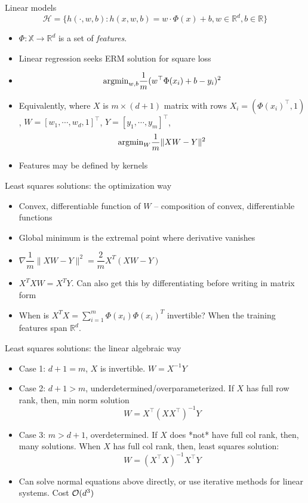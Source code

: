 \documentclass[final]{beamer}
\begin{document}
\begin{frame}{Linear models}
	\begin{equation}
		\mathcal{H} = \{h(\cdot, w, b): h(x, w, b) = w\cdot \Phi(x) + b, w \in \mathbb{R}^d, b \in \mathbb{R} \}
	\end{equation}
\pause
\begin{itemize}
	\item $\Phi: \mathbb{X} \to \mathbb{R}^d$ is a set of \emph{features}.
	\pause
	\item Linear regression seeks ERM solution for square loss
	\pause
	\item $${\rm arg min}_{w, b} \dfrac{1}{m} (w^\top \Phi(x_i) + b - y_i)^2$$
	\pause 
\item Equivalently, where $X$ is $m\times (d+1)$ matrix with rows $X_i = (\Phi(x_i)^\top, 1)$, $W = [w_1, \cdots, w_d, 1]^\top$, $Y = [y_1, \cdots, y_m]^\top$,
	\pause
	$$ {\rm arg min}_{W} \dfrac{1}{m} \|X W - Y\|^2$$
\item Features may be defined by kernels
\end{itemize}
\end{frame}
\begin{frame}{Least squares solutions: the optimization way}
	\begin{itemize}
		\item Convex, differentiable function of $W$ -- composition of convex, differentiable functions
		\pause
		\item Global minimum is the extremal point where derivative vanishes
		\pause
		\item $\nabla \dfrac{1}{m}\|X W - Y\|^2 = \dfrac{2}{m} X^T(XW - Y)$
		\pause
		\item $X^T X W = X^T Y$. Can also get this by differentiating before writing in matrix form
		\pause
		\item When is $X^T X = \sum_{i=1}^m \Phi(x_i) \Phi(x_i)^T$ invertible? When the training features span $\mathbb{R}^d$.  
	\end{itemize}
\end{frame}
\begin{frame}{Least squares solutions: the linear algebraic way}
	\begin{itemize}
		\item Case 1: $d+1 = m$, $X$ is invertible. $W = X^{-1} Y$
		\pause 
	\item Case 2: $d+1 > m$, underdetermined/overparameterized. If $X$ has full row rank, then, min norm solution	$$ W = X^\top (X X^\top)^{-1} Y$$
\pause
	\item Case 3: $m > d+1$, overdetermined. If $X$ does *not* have full col rank, then, many solutions. When $X$ has full col rank, then, least squares solution: $$ W = (X^\top X)^{-1} X^\top Y$$
	\pause
\item Can solve normal equations above directly, or use iterative methods for linear systems. Cost ${\cal O}(d^3)$ 
\end{itemize}
\end{frame}
\end{document}
